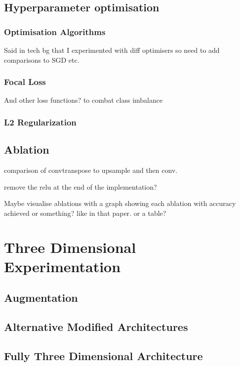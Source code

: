 \subsection{Hyperparameter optimisation}

\subsubsection{Optimisation Algorithms}

Said in tech bg that I experimented with diff optimisers so need to add comparisons to SGD etc.

\subsubsection{Focal Loss}

And other loss functions? to combat class imbalance

\subsubsection{L2 Regularization}

\subsection{Ablation}

comparison of convtranspose to upsample and then conv.

remove the relu at the end of the implementation?

Maybe visualise ablations with a graph showing each ablation with accuracy achieved or something? like in that paper. or a table?

\section{Three Dimensional Experimentation}

\subsection{Augmentation}

\subsection{Alternative Modified Architectures}

\subsection{Fully Three Dimensional Architecture}

